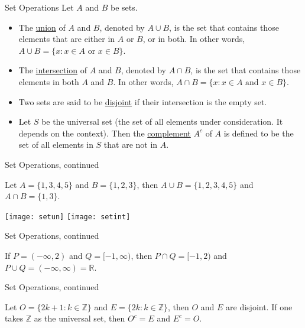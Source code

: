 \begin{frame}{Set Operations}
 Let $A$ and $B$ be sets. 
\begin{itemize}
\item The \underline{union} of $A$ and $B$, denoted by $A\cup B$, is the set that contains those elements that are either in $A$ or $B$, or in both.  In other words, $A\cup B=\{x: x\in A \text{ or } x\in B\}$. 
\item The \underline{intersection} of $A$ and $B$, denoted by $A\cap B$, is the set that contains those elements in both $A$ and $B$.  In other words, $A\cap B=\{x: x\in A \text{ and } x\in B\}$. 
\item Two sets are said to be \underline{disjoint} if their intersection is the empty set. 
\item Let $S$ be the universal set (the set of all elements under consideration. It depends on the context).  Then the \underline{complement} $A^c$ of $A$ is defined to be the set of all elements in $S$ that are not in $A$.
\end{itemize}

\end{frame}

\begin{frame}{Set Operations, continued}
\begin{example} Let $A=\{1,3,4,5\}$ and $B=\{1,2,3\}$, then $A\cup B=\{1,2,3,4,5\}$ and $A\cap B=\{1,3\}$.
\end{example}

\begin{center}
\texttt{[image: setun]}
\texttt{[image: setint]}
\end{center}
\end{frame}

\begin{frame}{Set Operations, continued}
\begin{example}
If $P=(-\infty, 2)$ and $Q=[-1,\infty)$, then $P\cap Q=[-1,2)$ and $P\cup Q=(-\infty,\infty)=\mathbb{R}$.
\end{example}
\end{frame}

\begin{frame}{Set Operations, continued}
\begin{example} Let $O=\{2k+1: k\in \mathbb{Z}\}$ and $E=\{2k: k\in \mathbb{Z}\}$, then $O$ and $E$ are disjoint.  If one takes $\mathbb{Z}$ as the universal set, then $O^c=E$ and $E^c=O$.
\end{example}

\end{frame}


